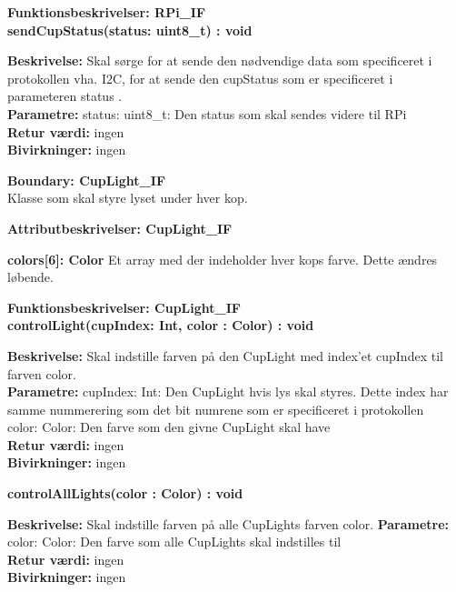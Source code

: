 \documentclass[Arkitektur/System_main.tex]{subfiles}
\begin{document}
{\large\textbf{Funktionsbeskrivelser: RPi\_IF}}\\[0.2cm]
\textbf{sendCupStatus(status: uint8\_t) : void}
\begin{adjustwidth}{1cm}{0pt}
\textbf{Beskrivelse:} Skal sørge for at sende den nødvendige data som specificeret i protokollen vha. I2C, for at sende den cupStatus som er specificeret i parameteren status .\\[0.2cm]
\textbf{Parametre:} status: uint8\_t: Den status som skal sendes videre til RPi \\[0.2cm]
\textbf{Retur værdi:} ingen \\[0.2cm]
\textbf{Bivirkninger:} ingen \\[0.2cm]
\end{adjustwidth}

{\large\textbf{Boundary:  CupLight\_IF}}\\
Klasse som skal styre lyset under hver kop.

{\large\textbf{Attributbeskrivelser: CupLight\_IF}}
\begin{adjustwidth}{1cm}{0pt}
\textbf{colors[6]: Color } Et array med der indeholder hver kops farve. Dette ændres løbende. \\[0.2cm]
\end{adjustwidth}
{\large\textbf{Funktionsbeskrivelser: CupLight\_IF}}\\[0.2cm]
\textbf{controlLight(cupIndex: Int, color : Color) : void}
\begin{adjustwidth}{1cm}{0pt}
\textbf{Beskrivelse:} Skal indstille farven på den CupLight med index'et cupIndex til farven color. \\[0.2cm]
\textbf{Parametre:}  cupIndex: Int: Den CupLight hvis lys skal styres. Dette index har samme nummerering som det bit numrene som er specificeret i protokollen\\color: Color: Den farve som den givne CupLight skal have \\[0.2cm]
\textbf{Retur værdi:} ingen \\[0.2cm]
\textbf{Bivirkninger:} ingen \\[0.2cm]
\end{adjustwidth}
\textbf{controlAllLights(color : Color) : void}
\begin{adjustwidth}{1cm}{0pt}
\textbf{Beskrivelse:} Skal indstille farven på alle CupLights farven color.
\textbf{Parametre:} color: Color: Den farve som alle CupLights skal indstilles til \\[0.2cm]
\textbf{Retur værdi:} ingen \\[0.2cm]
\textbf{Bivirkninger:} ingen \\[0.2cm]
\end{adjustwidth}
\end{document}
